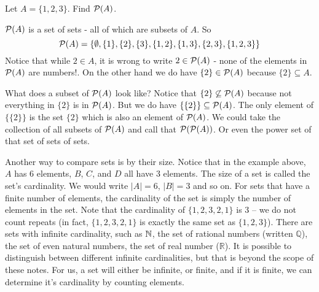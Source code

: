 \documentclass[12pt]{article}
\begin{document}
\begin{example}
  Let $A = \{1,2,3\}$.  Find $\mathcal P(A)$.
  \begin{solution}
    $\mathcal P(A)$ is a set of sets - all of which are subsets of $A$.  So
    \[\mathcal P(A) = \{ \emptyset, \{1\}, \{2\}, \{3\}, \{1,2\}, \{1, 3\}, \{2,3\}, \{1,2,3\}\}\]
    Notice that while $2 \in A$, it is wrong to write $2 \in \mathcal P(A)$ - none of the elements in $\mathcal P(A)$ are numbers!.  On the other hand we do have $\{2\} \in \mathcal P(A)$ because $\{2\} \subseteq A$.  
    
    What does a subset of $\mathcal P(A)$ look like?  Notice that $\{2\} \not\subseteq \mathcal P(A)$ because not everything in $\{2\}$ is in $\mathcal P(A)$.  But we do have $\{ \{2\} \} \subseteq \mathcal P(A)$.  The only element of $\{\{2\}\}$ is the set $\{2\}$ which is also an element of $\mathcal P(A)$.  We could take the collection of all subsets of $\mathcal P(A)$ and call that $\mathcal P(\mathcal P(A))$.  Or even the power set of that set of sets of sets. 
  \end{solution}

\end{example}


Another way to compare sets is by their size.  Notice that in the example above, $A$ has 6 elements, $B$, $C$, and $D$ all have 3 elements.  The size of a set is called the set's cardinality.  We would write $|A| = 6$, $|B| = 3$ and so on.  For sets that have a finite number of elements, the cardinality of the set is simply the number of elements in the set.  Note that the cardinality of $\{ 1, 2, 3, 2, 1\}$ is 3 -- we do not count repeats (in fact, $\{1, 2, 3, 2, 1\}$ is exactly the same set as $\{1, 2, 3\}$).  There are sets with infinite cardinality, such as $\mathbb N$, the set of rational numbers (written $\mathbb Q$), the set of even natural numbers, the set of real number ($\mathbb R$).  It is possible to distinguish between different infinite cardinalities, but that is beyond the scope of these notes.  For us, a set will either be infinite, or finite, and if it is finite, we can determine it's cardinality by counting elements.
\end{document}
